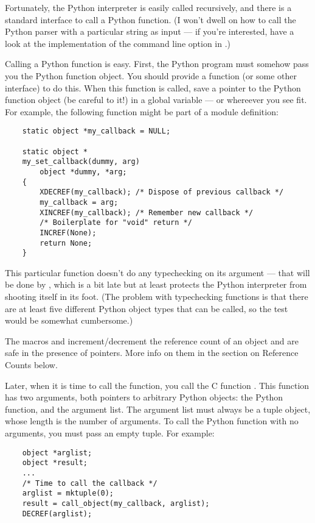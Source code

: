 Fortunately, the Python interpreter is easily called recursively, and
there is a standard interface to call a Python function.  (I won't
dwell on how to call the Python parser with a particular string as
input --- if you're interested, have a look at the implementation of
the  command line option in .)

Calling a Python function is easy.  First, the Python program must
somehow pass you the Python function object.  You should provide a
function (or some other interface) to do this.  When this function is
called, save a pointer to the Python function object (be careful to
 it!) in a global variable --- or whereever you see fit.
For example, the following function might be part of a module
definition:

\begin{verbatim}
    static object *my_callback = NULL;

    static object *
    my_set_callback(dummy, arg)
        object *dummy, *arg;
    {
        XDECREF(my_callback); /* Dispose of previous callback */
        my_callback = arg;
        XINCREF(my_callback); /* Remember new callback */
        /* Boilerplate for "void" return */
        INCREF(None);
        return None;
    }
\end{verbatim}

This particular function doesn't do any typechecking on its argument
--- that will be done by , which is a bit late but
at least protects the Python interpreter from shooting itself in its
foot.  (The problem with typechecking functions is that there are at
least five different Python object types that can be called, so the
test would be somewhat cumbersome.)

The macros  and  increment/decrement
the reference count of an object and are safe in the presence of
 pointers.  More info on them in the section on Reference
Counts below.

Later, when it is time to call the function, you call the C function
.  This function has two arguments, both pointers
to arbitrary Python objects: the Python function, and the argument
list.  The argument list must always be a tuple object, whose length
is the number of arguments.  To call the Python function with no
arguments, you must pass an empty tuple.  For example:

\begin{verbatim}
    object *arglist;
    object *result;
    ...
    /* Time to call the callback */
    arglist = mktuple(0);
    result = call_object(my_callback, arglist);
    DECREF(arglist);
\end{verbatim}

